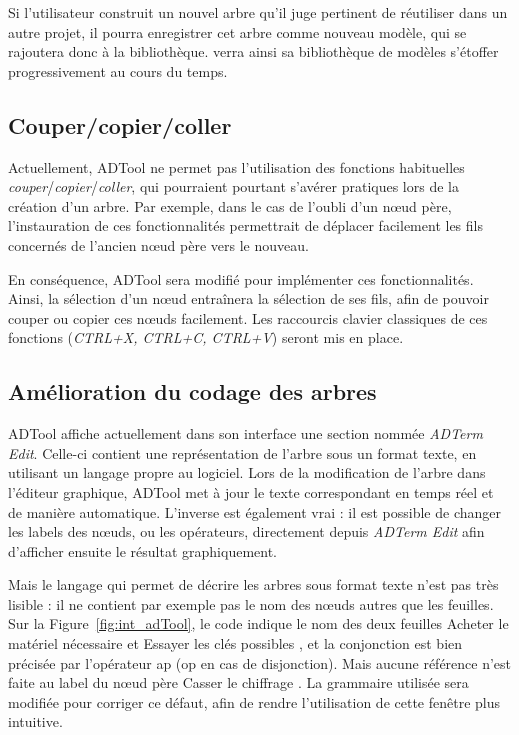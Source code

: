         Si l'utilisateur construit un nouvel arbre qu'il juge pertinent de réutiliser dans un autre projet, il pourra enregistrer cet arbre comme nouveau modèle, qui se rajoutera donc à la bibliothèque. \glasir{} verra ainsi sa bibliothèque de modèles s'étoffer progressivement au cours du temps.
    
    \subsection{Couper/copier/coller}   
        Actuellement, ADTool ne permet pas l'utilisation des fonctions habituelles \emph{couper}/\emph{copier}/\emph{coller}, qui pourraient pourtant s'avérer pratiques lors de la création d'un arbre. Par exemple, dans le cas de l'oubli d'un nœud père, l'instauration de ces fonctionnalités permettrait de déplacer facilement les fils concernés de l'ancien nœud père vers le nouveau.
        
        En conséquence, ADTool sera modifié pour implémenter ces fonctionnalités. Ainsi, la sélection d'un nœud entraînera la sélection de ses fils, afin de pouvoir couper ou copier ces nœuds facilement. Les raccourcis clavier \og classiques \fg{}  de ces fonctions (\emph{CTRL+X, CTRL+C, CTRL+V}) seront mis en place.

    \subsection{Amélioration du codage des arbres}
        ADTool affiche actuellement dans son interface une section nommée \emph{ADTerm Edit}. Celle-ci contient une représentation de l'arbre sous un format texte, en utilisant un langage propre au logiciel. Lors de la modification de l'arbre dans l'éditeur graphique, ADTool met à jour le texte correspondant en temps réel et de manière automatique. L'inverse est également vrai : il est possible de changer les labels des nœuds, ou les opérateurs, directement depuis \emph{ADTerm Edit} afin d'afficher ensuite le résultat graphiquement.

        Mais le langage qui permet de décrire les arbres sous format texte n'est pas très lisible : il ne contient par exemple pas le nom des nœuds autres que les feuilles. Sur la {\sc Figure}~\ref{fig:int_adTool}, le code indique le nom des deux feuilles \og Acheter le matériel nécessaire \fg{} et \og Essayer les clés possibles \fg{}, et la conjonction est bien précisée par l'opérateur \og ap \fg{} (\og op \fg{} en cas de disjonction). Mais aucune référence n'est faite au label du nœud père \og Casser le chiffrage \fg{}. La grammaire utilisée sera modifiée pour corriger ce défaut, afin de rendre l'utilisation de cette fenêtre plus intuitive.

